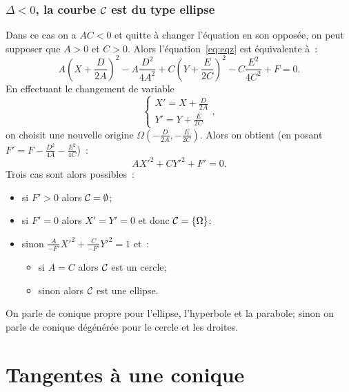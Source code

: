\subsubsection{$\Delta<0$, la courbe $\mathcal{C}_{}$ est du type ellipse}
Dans ce cas on a $AC<0$ et quitte à changer l'équation en son opposée, on peut supposer que $A>0$ et $C>0$. Alors l'équation~\eqref{eq:eqz} est équivalente à~:
\begin{equation}
  A\left(X+\frac{D}{2A}\right)^2 -A\frac{D^2}{4A^2} + C\left(Y+\frac{E}{2C}\right)^2 -C\frac{E^2}{4C^2}+F=0.
\end{equation}
En effectuant le changement de variable
\begin{equation}
  \begin{cases}
    X' = X+\frac{D}{2A}\\Y' = Y+\frac{E}{2C}
  \end{cases},
\end{equation}
on choisit une nouvelle origine $\Omega\left(-\frac{D}{2A},-\frac{E}{2C}\right)$. Alors on obtient (en posant $F'=F-\frac{D^2}{4A}-\frac{E^2}{4C}$)~:
\begin{equation}
  AX'^2+CY'^2+F'=0.
\end{equation}
Trois cas sont alors possibles~:
\begin{itemize}
\item si $F'>0$ alors $\mathcal{C}_{}=\emptyset$;
\item si $F'=0$ alors $X'=Y'=0$ et donc $\mathcal{C}_{}=\{\Omega\}$;
\item sinon $\frac{A}{-F'}X'^2+\frac{C}{-F'}Y'^2=1$ et~:
  \begin{itemize}
  \item si $A=C$ alors $\mathcal{C}_{}$ est un cercle;
  \item sinon alors $\mathcal{C}_{}$ est une ellipse.
  \end{itemize}
\end{itemize}
On parle de conique propre pour l'ellipse, l'hyperbole et la parabole; sinon on parle de conique dégénérée pour le cercle et les droites.

\section{Tangentes à une conique}
